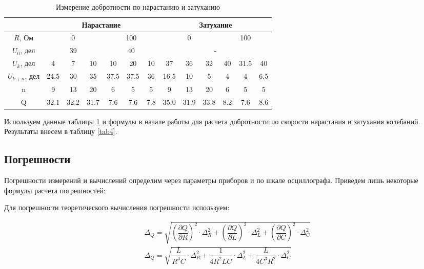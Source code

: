 \documentclass{lab}
\begin{document}
\begin{table}[H]
	\centering
	\renewcommand{\arraystretch}{1.3}
	\begin{tabular}{|c|c|c|c|c|c|c|c|c|c|c|c|c|}
		\hline
						& \multicolumn{6}{c|}{Нарастание}						& \multicolumn{6}{c|}{Затухание}						\\ \hline
		$R$, Ом			& \multicolumn{3}{c|}{0}	& \multicolumn{3}{c|}{100}	& \multicolumn{3}{c|}{0}	& \multicolumn{3}{c|}{100}	\\ \hline
		$U_{0}$, дел	& \multicolumn{3}{c|}{39}	& \multicolumn{3}{c|}{40}	& \multicolumn{6}{c|}{-} 								\\ \hline
		$U_{k}$, дел	& 4 	& 7		& 10	& 10	& 20	& 10	& 37	& 36	& 32	& 40	& 31.5	& 40	\\ \hline
		$U_{k+n}$, дел	& 24.5 	& 30	& 35	& 37.5	& 37.5	& 36	& 16.5	& 10	& 5		& 4		& 4		& 6.5	\\ \hline
		n				& 9		& 13	& 20	& 6		& 5		& 5		& 9		& 13	& 20	& 6		& 5		& 5		\\ \hline
		Q 				& 32.1	& 32.2	& 31.7	& 7.6	& 7.6	& 7.8	& 35.0	& 31.9	& 33.8	& 8.2	& 7.6 	& 8.6	\\ \hline
	\end{tabular}
	\caption{\footnotesize Измерение добротности по нарастанию и затуханию}
	\label{tab3}
	\renewcommand{\arraystretch}{1}
\end{table}

Используем данные таблицы \ref{tab3} и формулы в начале работы для расчета добротности по
скорости нарастания и затухания колебаний. Результаты внесем в таблицу \ref{tab4}.

\subsection*{Погрешности}

Погрешности измерений и вычислений определим через параметры приборов и по шкале
осциллографа. Приведем лишь некоторые формулы расчета погрешностей:

Для погрешности теоретического вычисления погрешности используем:

\begin{equation}
\begin{aligned}
	&\Delta_Q = \sqrt{\left( \dfrac{\partial Q}{\partial R} \right)^2 \cdot \Delta_R^2 +
	\left( \dfrac{\partial Q}{\partial L} \right)^2 \cdot \Delta_L^2 + \left( \dfrac{\partial Q}{\partial C} \right)^2 \cdot \Delta_C^2} \\
	&\Delta_Q = \sqrt{\dfrac{L}{R^4C} \cdot \Delta_R^2 + \dfrac{1}{4R^2LC} \cdot \Delta_L^2 + \dfrac{L}{4C^3R^2} \cdot \Delta_C^2}
\end{aligned}
\end{equation}
\end{document}
